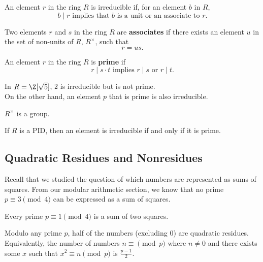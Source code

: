 \documentclass[11pt]{article}
\begin{document}
\begin{definition}[Irreducible]
An element $r$ in the ring $R$ is irreducible if, for an element $b$ in $R$, 
\[
    b \mid r \text{ implies that } b \text { is a unit or an associate to } r.
\]
\end{definition}

\begin{definition}[Associates]
Two elements $r$ and $s$ in the ring $R$ are \textbf{associates} if there exists an element $u$ in the set of non-units of $R$, $R^{\times}$, such that
\[
    r = us.
\]
\end{definition}

\begin{definition}[Prime]
An element $r$ in the ring $R$ is \textbf{prime} if 
\[
    r \mid s \cdot t \text{ implies } r \mid s \text{ or } r \mid t.
\]
\end{definition}

\begin{remark} 
In $R = \Z[\sqrt{5}]$, $2$ is irreducible but is not prime. \\

On the other hand, an element $p$ that is prime is also irreducible.
\end{remark}

\begin{exercise}
$R^{\times}$ is a group.    
\end{exercise}

\begin{remark}
If $R$ is a PID, then an element is irreducible if and only if it is prime.
\end{remark}

\subsection{Quadratic Residues and Nonresidues}

Recall that we studied the question of which numbers are represented as sums of squares. 
From our modular arithmetic section, we know that no prime $p \equiv 3 \pmod 4$ can be expressed as a sum of squares.

\begin{lemma}
Every prime $p \equiv 1 \pmod 4$ is a sum of two squares.
\end{lemma}

\begin{lemma}
Modulo any prime $p$, half of the numbers (excluding $0$) are quadratic residues. \\

Equivalently, the number of numbers $n \equiv \pmod p$ where
$n \neq 0$ and there exists some $x$ such that $x^2 \equiv n \pmod p$ is $\frac{p-1}{2}.$
\end{lemma}
\end{document}
